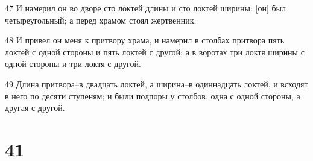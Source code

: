 \par 47 И намерил он во дворе сто локтей длины и сто локтей ширины: [он] был четыреугольный; а перед храмом стоял жертвенник.
\par 48 И привел он меня к притвору храма, и намерил в столбах притвора пять локтей с одной стороны и пять локтей с другой; а в воротах три локтя ширины с одной стороны и три локтя с другой.
\par 49 Длина притвора--в двадцать локтей, а ширина--в одиннадцать локтей, и всходят в него по десяти ступеням; и были подпоры у столбов, одна с одной стороны, а другая с другой.

\chapter{41}

